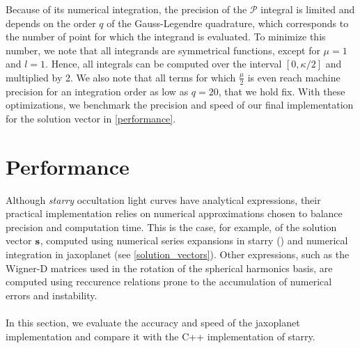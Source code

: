 \documentclass[modern]{aastex631}
\begin{document}
Because of its numerical integration, the precision of the $\mathcal{P}$ integral is limited and depends on the order $q$ of the Gauss-Legendre quadrature, which corresponds to the number of point for which the integrand is evaluated. To minimize this number, we note that all integrands are symmetrical functions, except for $\mu=1$ and $l=1$. Hence, all integrals can be computed over the interval $[0, \kappa/2]$ and multiplied by 2. We also note that all terms for which $\frac{\mu}{2}$ is even reach machine precision for an integration order as low as $q=20$, that we hold fix. With these optimizations, we benchmark the precision and speed of our final implementation for the solution vector in \autoref{performance}.
    
\newpage
\section{Performance}\label{performance}
Although \textit{starry} occultation light curves have analytical expressions, their practical implementation relies on numerical approximations chosen to balance precision and computation time. This is the case, for example, of the solution vector ${\mathbf{s}}$, computed using numerical series expansions in \textsf{starry} (\citealt[section D.2.3]{starry}) and numerical integration in \textsf{jaxoplanet} (see \autoref{solution_vectors}). Other expressions, such as the Wigner-D matrices used in the rotation of the spherical harmonics basis, are computed using reccurence relations prone to the accumulation of numerical errors and instability.\\\\
In this section, we evaluate the accuracy and speed of the \textsf{jaxoplanet} implementation and compare it with the C++ implementation of \textsf{starry}.
\end{document}
